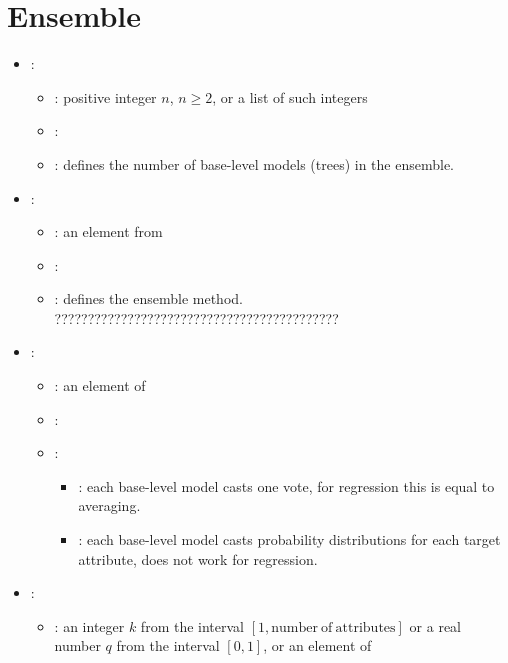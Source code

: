 \section{Ensemble}


\begin{itemize}
    \item {}:
           \begin{itemize}
                \item \optionPossibleValues{}: positive integer $n$, $n \geq 2$, or a list of such integers
                \item \optionDefaultValue{}: 
                \item \optionDescrption{}: defines the number of base-level models (trees) in the ensemble.
           \end{itemize}
    \item {}:
           \begin{itemize}
                \item \optionPossibleValues{}: an element from 
                \item \optionDefaultValue{}: 
                \item \optionDescrption{}: defines the ensemble method. ???????????????????????????????????????????
           \end{itemize}
    \item {}:
           \begin{itemize}
                \item \optionPossibleValues{}: an element of 
                \item \optionDefaultValue{}: 
                \item \optionDescrption{}:
                	\begin{itemize}
                		\item {}: each base-level model casts one vote, for regression this is equal to averaging.
                		\item {}: each base-level model casts probability distributions for each target attribute, does not work for regression.
                	\end{itemize}
           \end{itemize}
    \item {}:
           \begin{itemize}
                \item \optionPossibleValues{}: an integer $k$ from the interval $[1, \mathrm{number\ of\ attributes}]$ or a real number $q$ from the interval $[0, 1]$, or an element
                of 


\end{itemize}
\end{itemize}
